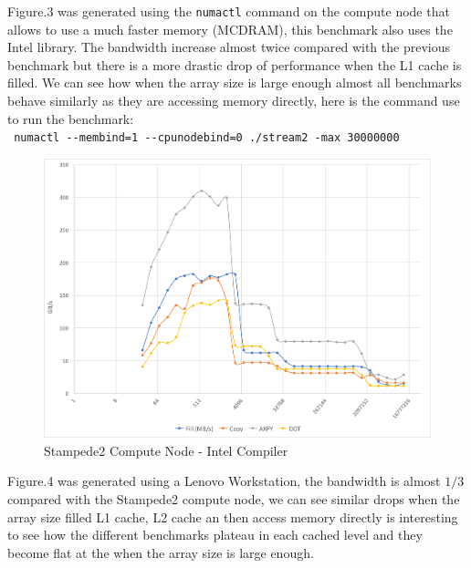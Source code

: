 \documentclass[12pt]{article} %
\begin{document}
\newpage

Figure.3 was generated using the \verb|numactl| command on the compute node that allows to use a much faster memory  (MCDRAM), this benchmark also uses the Intel library. The bandwidth increase almost twice compared with the previous benchmark but there is a more drastic drop of performance when the L1 cache is filled. We can see how when the array size is large enough almost all benchmarks behave similarly as they are accessing memory directly, here is the command use to run the benchmark: \\ \verb| numactl --membind=1 --cpunodebind=0 ./stream2 -max 30000000|

\begin{figure}[htb]
\caption{Stampede2 Compute Node - Intel Compiler}\label{fig:benchmark03}
\centering
\includegraphics[width=\textwidth,keepaspectratio]{imgs/img03.png}
\end{figure}

\newpage

Figure.4 was generated using a Lenovo Workstation, the bandwidth is almost $1/3$ compared with the Stampede2 compute node, we can see similar drops when the array size filled L1 cache, L2 cache an then access memory directly is interesting to see how the different benchmarks plateau in each cached level and they become flat at the when the array size is large enough.
\end{document}
